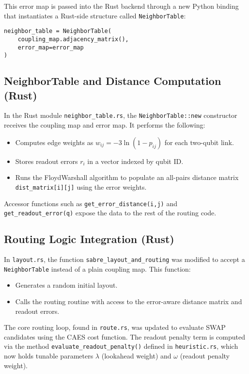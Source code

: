 \documentclass[conference]{IEEEtran}
\begin{document}
This error map is passed into the Rust backend through a new Python binding that instantiates a Rust-side structure called \texttt{NeighborTable}:

\begin{verbatim}
neighbor_table = NeighborTable(
    coupling_map.adjacency_matrix(), 
    error_map=error_map
)
\end{verbatim}

\subsection{NeighborTable and Distance Computation (Rust)}

In the Rust module \texttt{neighbor\_table.rs}, the \texttt{NeighborTable::new} constructor receives the coupling map and error map. It performs the following:
\begin{itemize}
    \item Computes edge weights as $w_{ij} = -3 \ln(1 - p_{ij})$ for each two-qubit link.
    \item Stores readout errors $r_i$ in a vector indexed by qubit ID.
    \item Runs the Floyd\textendash Warshall algorithm to populate an all-pairs distance matrix \texttt{dist\_matrix[i][j]} using the error weights.
\end{itemize}

Accessor functions such as \texttt{get\_error\_distance(i,j)} and \texttt{get\_readout\_error(q)} expose the data to the rest of the routing code.

\subsection{Routing Logic Integration (Rust)}

In \texttt{layout.rs}, the function \texttt{sabre\_layout\_and\_routing} was modified to accept a \texttt{NeighborTable} instead of a plain coupling map. This function:
\begin{itemize}
    \item Generates a random initial layout.
    \item Calls the routing routine with access to the error-aware distance matrix and readout errors.
\end{itemize}

The core routing loop, found in \texttt{route.rs}, was updated to evaluate SWAP candidates using the CAES cost function. The readout penalty term is computed via the method \texttt{evaluate\_readout\_penalty()} defined in \texttt{heuristic.rs}, which now holds tunable parameters $\lambda$ (lookahead weight) and $\omega$ (readout penalty weight).
\end{document}
